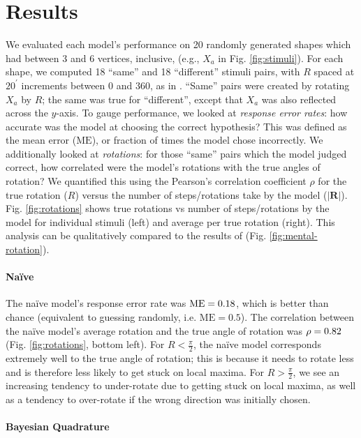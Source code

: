 \documentclass{article} %
\newcommand{\ME}[0]{\mathrm{ME}}
\newcommand{\naive}[0]{na\"ive}
\newcommand{\Naive}[0]{Na\"ive}
\begin{document}
\section{Results}

We evaluated each model's performance on 20 randomly generated shapes
which had between 3 and 6 vertices, inclusive, (e.g., $X_a$ in Fig.
\ref{fig:stimuli}). For each shape, we computed 18 ``same'' and 18
``different'' stimuli pairs, with $R$ spaced at $20^\prime$ increments
between 0 and 360, as in \cite{Shepard1971}. ``Same'' pairs were
created by rotating $X_a$ by $R$; the same was true for ``different'',
except that $X_a$ was also reflected across the $y$-axis. To gauge
performance, we looked at \textit{response error rates}: how accurate
was the model at choosing the correct hypothesis? This was defined as
the mean error ($\ME{}$), or fraction of times the model chose
incorrectly.  We additionally looked at \textit{rotations}: for those
``same'' pairs which the model judged correct, how correlated were the
model's rotations with the true angles of rotation?  We quantified
this using the Pearson's correlation coefficient $\rho$ for the true
rotation ($R$) versus the number of steps/rotations take by the model
($\vert \mathbf{R}\vert$). Fig. \ref{fig:rotations} shows true
rotations vs number of steps/rotations by the model for individual
stimuli (left) and average per true rotation (right). This analysis
can be qualitatively compared to the results of \cite{Shepard1971}
(Fig.  \ref{fig:mental-rotation}).

\paragraph{\Naive{}} 

The \naive{} model's response error rate was $\NaiveME{}$, which is
better than chance (equivalent to guessing randomly,
i.e. $\ME{}=0.5$). The correlation between the \naive{} model's
average rotation and the true angle of rotation was $\rho=0.82{}$
(Fig. \ref{fig:rotations}, bottom left). For $R<\frac{\pi}{2}$, the
\naive{} model corresponds extremely well to the true angle of
rotation; this is because it needs to rotate less and is therefore
less likely to get stuck on local maxima. For $R>\frac{\pi}{2}$, we
see an increasing tendency to under-rotate due to getting stuck on
local maxima, as well as a tendency to over-rotate if the wrong
direction was initially chosen.

\paragraph{Bayesian Quadrature}
\end{document}
